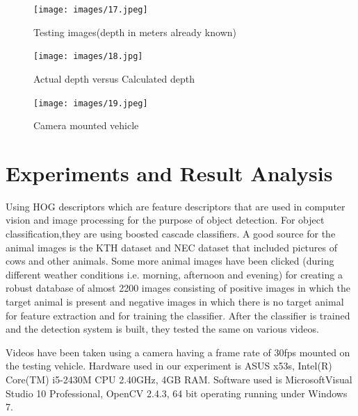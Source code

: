 \documentclass[14pt,a4paper,final]{extreport}
\begin{document}
\begin{figure}[h]
	\begin{center}
		\texttt{[image: images/17.jpeg]}
		\vspace{.1 cm}
		\caption[Testing images(depth in meters already known)]{Testing images(depth in meters already known)}
	\end{center}
\end{figure}

\begin{figure}[h]
	\begin{center}
		\texttt{[image: images/18.jpg]}
		\vspace{.1 cm}
		\caption[Actual depth versus Calculated depth]{Actual depth versus Calculated depth}
	\end{center}
\end{figure}

\begin{figure}[h]
	\begin{center}
		\texttt{[image: images/19.jpeg]}
		\vspace{.1 cm}
		\caption[Camera mounted vehicle]{Camera mounted vehicle}
	\end{center}
\end{figure}

\chapter{Experiments and Result Analysis}
\item Using HOG descriptors which are feature descriptors that are used in computer vision and image processing for the purpose of object detection. For object classification,they are using boosted cascade classifiers. A good source for the animal images is the KTH dataset and NEC dataset that included pictures of cows and other animals. Some more animal images have been clicked (during different weather conditions i.e. morning, afternoon and evening) for creating a robust database of almost 2200 images consisting of positive images in which the target animal is present and negative images in which there is no target animal for feature extraction and for training the classifier. After the classifier is trained and the detection system is built, they tested the same on various videos.

Videos have been taken using a camera having a frame rate of 30fps mounted on the testing vehicle. Hardware used in our experiment is ASUS x53s, Intel(R) Core(TM) i5-2430M CPU 2.40GHz, 4GB RAM. Software used is MicrosoftVisual Studio 10 Professional, OpenCV 2.4.3, 64 bit operating running under Windows 7.
\end{document}
